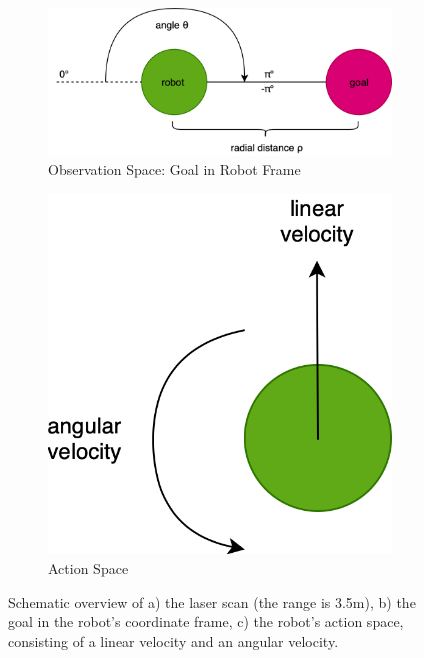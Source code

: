 \begin{figure}
\begin{subfigure}[b]{0.6\textwidth}
   \includegraphics[width=1\linewidth]{figures/observation_space_300.png}
   \caption{Observation Space: Goal in Robot Frame}
   \label{fig:observation-space-goal}
\end{subfigure}
\begin{subfigure}[b]{0.4\textwidth}
   \includegraphics[width=1\linewidth]{figures/action_space_300.png}
   \caption{Action Space}
   \label{fig:action-space}
\end{subfigure}

\caption[]{Schematic overview of a) the laser scan (the range is 3.5m), b) the goal in the robot's coordinate frame, c) the robot's action space, consisting of a linear velocity and an angular velocity.}
\end{figure}